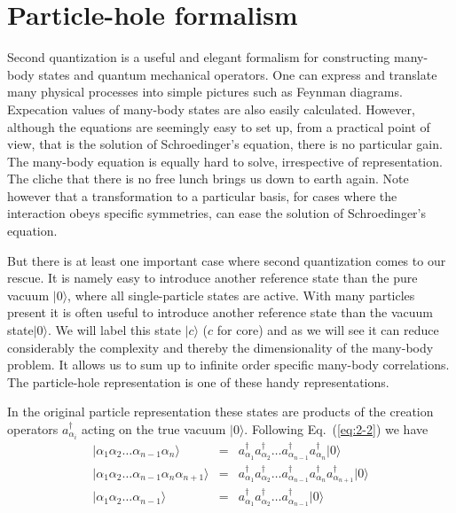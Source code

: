 \documentclass[graybox,sectrefs,envcountresetchap,open=right]{svmonodo}
\begin{document}
\section{Particle-hole formalism}

Second quantization is a useful and elegant formalism  for constructing many-body  states and 
quantum mechanical operators. One can express and translate many physical processes
into simple pictures such as Feynman diagrams. Expecation values of many-body states are also easily calculated.
However, although the equations are seemingly easy to set up, from  a practical point of view, that is
the solution of Schroedinger's equation, there is no particular gain.
The many-body equation is equally hard to solve, irrespective of representation. 
The cliche that 
there is no free lunch brings us down to earth again.  
Note however that a transformation to a particular
basis, for cases where the interaction obeys specific symmetries, can ease the solution of Schroedinger's equation. 

But there is at least one important case where second quantization comes to our rescue.
It is namely easy to introduce another reference state than the pure vacuum $|0\rangle $, where all single-particle states are active.
With many particles present it is often useful to introduce another reference state  than the vacuum state$|0\rangle $. We will label this state $|c\rangle$ ($c$ for core) and as we will see it can reduce 
considerably the complexity and thereby the dimensionality of the many-body problem. It allows us to sum up to infinite order specific many-body correlations.  The particle-hole representation is one of these handy representations. 





In the original particle representation these states are products of the creation operators  $a_{\alpha_i}^\dagger$ acting on the true vacuum $|0\rangle $.
Following Eq.~(\ref{eq:2-2}) we have 
\begin{eqnarray}
 |\alpha_1\alpha_2\dots\alpha_{n-1}\alpha_n\rangle &=& a_{\alpha_1}^\dagger a_{\alpha_2}^\dagger \dots
					a_{\alpha_{n-1}}^\dagger a_{\alpha_n}^\dagger |0\rangle  \label{eq:2-47a} \\
	|\alpha_1\alpha_2\dots\alpha_{n-1}\alpha_n\alpha_{n+1}\rangle &=&
		a_{\alpha_1}^\dagger a_{\alpha_2}^\dagger \dots a_{\alpha_{n-1}}^\dagger a_{\alpha_n}^\dagger
		a_{\alpha_{n+1}}^\dagger |0\rangle  \label{eq:2-47b} \\
	|\alpha_1\alpha_2\dots\alpha_{n-1}\rangle &=& a_{\alpha_1}^\dagger a_{\alpha_2}^\dagger \dots
		a_{\alpha_{n-1}}^\dagger |0\rangle  \label{eq:2-47c}
\end{eqnarray}
\end{document}
